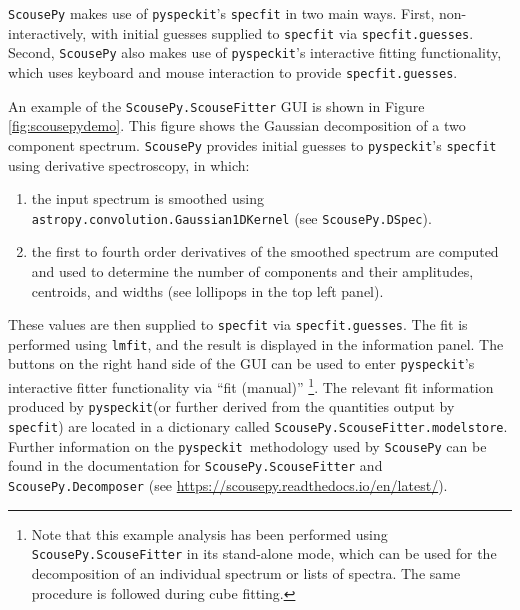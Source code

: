 \documentclass[twocolumn,linenumbers]{aastex63}
\newcommand{\pyspeckit}{\texttt{pyspeckit}\xspace}
\begin{document}
\texttt{ScousePy} makes use of \pyspeckit's \texttt{specfit} in two main ways.
First, non-interactively, with initial guesses supplied to \texttt{specfit} via \texttt{specfit.guesses}.
Second, \texttt{ScousePy} also makes use of \pyspeckit's interactive fitting functionality, which uses keyboard and mouse interaction to provide \texttt{specfit.guesses}.

An example of the \texttt{ScousePy.ScouseFitter} GUI is shown in Figure \ref{fig:scousepydemo}. This figure shows the Gaussian decomposition of a two component spectrum. \texttt{ScousePy} provides initial guesses to \pyspeckit's \texttt{specfit} using derivative spectroscopy, in which:
\begin{enumerate}  
\item the input spectrum is smoothed using \texttt{astropy.convolution.Gaussian1DKernel} (see \texttt{ScousePy.DSpec}).
\item the first to fourth order derivatives of the smoothed spectrum are computed and used to determine the number of components and their amplitudes, centroids, and widths (see lollipops in the top left panel). 
\end{enumerate}
These values are then supplied to \texttt{specfit} via \texttt{specfit.guesses}. The fit is performed using \texttt{lmfit}, and the result is displayed in the information panel. The buttons on the right hand side of the GUI can be used to enter \pyspeckit's interactive fitter functionality via ``fit (manual)'' \footnote{Note that this example analysis has been performed using \texttt{ScousePy.ScouseFitter} in its stand-alone mode, which can be used for the decomposition of an individual spectrum or lists of spectra. The same procedure is followed during cube fitting.}. The relevant fit information produced by \pyspeckit (or further derived from the quantities output by \texttt{specfit}) are located in a dictionary called \texttt{ScousePy.ScouseFitter.modelstore}. Further information on the \pyspeckit \ methodology used by \texttt{ScousePy} can be found in the documentation for \texttt{ScousePy.ScouseFitter} and \texttt{ScousePy.Decomposer} (see \url{https://scousepy.readthedocs.io/en/latest/}). 
\end{document}
